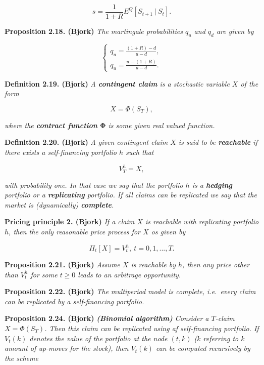 \documentclass[
]{book}
\begin{document}
\[
s=\frac{1}{1+R}E^Q[S_{t+1}\ \vert\ S_t].
\]

\textbf{Proposition 2.18. (Bjork)} \emph{The martingale probabilities \(q_u\) and \(q_d\) are given by}

\[
\left\{\begin{matrix}q_u=\frac{(1+R)-d}{u-d},\\ q_u=\frac{u-(1+R)}{u-d}.\end{matrix}\right.
\]

\textbf{Definition 2.19. (Bjork)} \emph{A \textbf{contingent claim} is a stochastic variable \(X\) of the form}

\[
X=\Phi(S_T),
\]

\emph{where the \textbf{contract function} \(\mathbf{\Phi}\) is some given real valued function.}

\textbf{Definition 2.20. (Bjork)} \emph{A given contingent claim \(X\) is said to be \textbf{reachable} if there exists a self-financing portfolio \(h\) such that}

\[
V_T^h=X,
\]

\emph{with probability one. In that case we say that the portfolio \(h\) is a \textbf{hedging} portfolio or a \textbf{replicating} portfolio. If all claims can be replicated we say that the market is \emph{(dynamically)} \textbf{complete}.}

\textbf{Pricing principle 2. (Bjork)} \emph{If a claim \(X\) is reachable with replicating portfolio \(h\), then the only reasonable price process for \(X\) os given by}

\[
\Pi_t[X]=V_t^h,\ t=0,1,...,T.
\]

\textbf{Proposition 2.21. (Bjork)} \emph{Assume \(X\) is reachable by \(h\), then any price other than \(V_t^h\) for some \(t\ge 0\) leads to an arbitrage opportunity.}

\textbf{Proposition 2.22. (Bjork)} \emph{The multiperiod model is complete, i.e.~every claim can be replicated by a self-financing portfolio.}

\textbf{Proposition 2.24. (Bjork)} \emph{\textbf{(Binomial algorithm)} Consider a \(T\)-claim \(X=\Phi(S_T)\). Then this claim can be replicated using af self-financing portfolio. If \(V_t(k)\) denotes the value of the portfolio at the node \((t,k)\) (\(k\) referring to \(k\) amount of up-moves for the stock), then \(V_t(k)\) can be computed recursively by the scheme}
\end{document}
